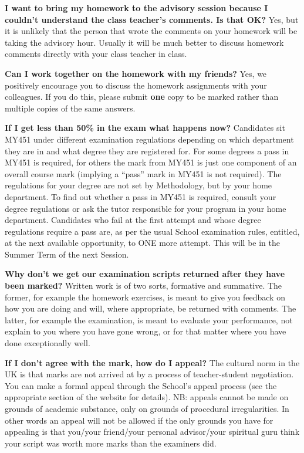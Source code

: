 \documentclass[11pt,a4paper,openany]{book}
\begin{document}
\textbf{I want to bring my homework to the advisory session because I
couldn't understand the class teacher's comments. Is that OK?} Yes, but
it is unlikely that the person that wrote the comments on your homework
will be taking the advisory hour. Usually it will be much better to
discuss homework comments directly with your class teacher in class.

\textbf{Can I work together on the homework with my friends?} Yes, we
positively encourage you to discuss the homework assignments with your
colleagues. If you do this, please submit \textbf{one} copy to be marked
rather than multiple copies of the same answers.

\textbf{If I get less than 50\% in the exam what happens now?}
Candidates sit MY451 under different examination regulations depending
on which department they are in and what degree they are registered for.
For some degrees a pass in MY451 is required, for others the mark from
MY451 is just one component of an overall course mark (implying a
``pass'' mark in MY451 is not required). The regulations for your degree
are not set by Methodology, but by your home department. To find out
whether a pass in MY451 is required, consult your degree regulations or
ask the tutor responsible for your program in your home department.
Candidates who fail at the first attempt and whose degree regulations
require a pass are, as per the usual School examination rules, entitled,
at the next available opportunity, to ONE more attempt. This will be in
the Summer Term of the next Session.

\textbf{Why don't we get our examination scripts returned after they
have been marked?} Written work is of two sorts, formative and
summative. The former, for example the homework exercises, is meant to
give you feedback on how you are doing and will, where appropriate, be
returned with comments. The latter, for example the examination, is
meant to evaluate your performance, not explain to you where you have
gone wrong, or for that matter where you have done exceptionally well.

\textbf{If I don't agree with the mark, how do I appeal?} The cultural
norm in the UK is that marks are not arrived at by a process of
teacher-student negotiation. You can make a formal appeal through the
School's appeal process (see the appropriate section of the website for
details). NB: appeals cannot be made on grounds of academic substance,
only on grounds of procedural irregularities. In other words an appeal
will not be allowed if the only grounds you have for appealing is that
you/your friend/your personal advisor/your spiritual guru think your
script was worth more marks than the examiners did.
\end{document}
